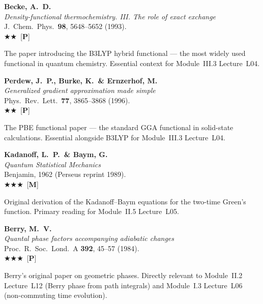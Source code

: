 \documentclass[11pt,a4paper]{article}
\newcommand{\essential}{$\bigstar\bigstar\bigstar$}
\newcommand{\recommended}{$\bigstar\bigstar$}
\newenvironment{bibentry}[1]{\begin{tcolorbox}[entrybox=#1,top=4pt,bottom=4pt]}{\end{tcolorbox}\smallskip}
\begin{document}
\begin{bibentry}{t4light}
\textbf{Becke, A.~D.}\\
\textit{Density-functional thermochemistry. III. The role of exact exchange}\\
J.~Chem.~Phys.~\textbf{98}, 5648--5652 (1993).\\[3pt]
\recommended\ [\textbf{P}]\\[3pt]
\begin{tcolorbox}[annotbox]
The paper introducing the B3LYP hybrid functional --- the most widely used
functional in quantum chemistry. Essential context for Module~III.3 Lecture~L04.
\end{tcolorbox}
\end{bibentry}

\begin{bibentry}{t4light}
\textbf{Perdew, J.~P., Burke, K.\ \& Ernzerhof, M.}\\
\textit{Generalized gradient approximation made simple}\\
Phys.~Rev.~Lett.~\textbf{77}, 3865--3868 (1996).\\[3pt]
\recommended\ [\textbf{P}]\\[3pt]
\begin{tcolorbox}[annotbox]
The PBE functional paper --- the standard GGA functional in solid-state calculations.
Essential alongside B3LYP for Module~III.3 Lecture~L04.
\end{tcolorbox}
\end{bibentry}

\begin{bibentry}{t4light}
\textbf{Kadanoff, L.~P.\ \& Baym, G.}\\
\textit{Quantum Statistical Mechanics}\\
Benjamin, 1962 (Perseus reprint 1989).\\[3pt]
\essential\ [\textbf{M}]\\[3pt]
\begin{tcolorbox}[annotbox]
Original derivation of the Kadanoff--Baym equations for the two-time Green's function.
Primary reading for Module~II.5 Lecture~L05.
\end{tcolorbox}
\end{bibentry}

\begin{bibentry}{t4light}
\textbf{Berry, M.~V.}\\
\textit{Quantal phase factors accompanying adiabatic changes}\\
Proc.~R.~Soc.~Lond.~A \textbf{392}, 45--57 (1984).\\[3pt]
\essential\ [\textbf{P}]\\[3pt]
\begin{tcolorbox}[annotbox]
Berry's original paper on geometric phases. Directly relevant to Module~II.2
Lecture~L12 (Berry phase from path integrals) and Module~I.3 Lecture~L06
(non-commuting time evolution).
\end{tcolorbox}
\end{bibentry}
\end{document}
